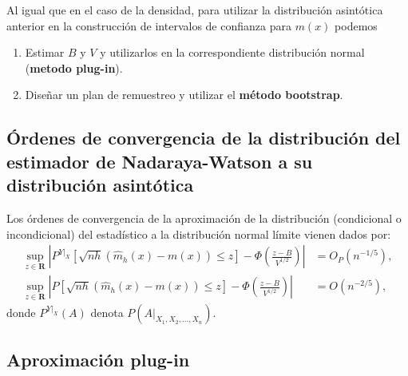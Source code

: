 \documentclass[
]{book}
\theoremstyle{break}
\theoremstyle{definition}
\theoremstyle{definition}
\theoremstyle{definition}
\theoremstyle{definition}
\theoremstyle{remark}
\begin{document}
Al igual que en el caso de la densidad, para utilizar la distribución
asintótica anterior en la construcción de intervalos de confianza para
\(m\left( x \right)\) podemos

\begin{enumerate}
\def\labelenumi{\arabic{enumi}.}
\item
  Estimar \(B\) y \(V\) y utilizarlos en la correspondiente distribución
  normal (\textbf{metodo plug-in}).
\item
  Diseñar un plan de remuestreo y utilizar el \textbf{método bootstrap}.
\end{enumerate}

\hypertarget{uxf3rdenes-de-convergencia-de-la-distribuciuxf3n-del-estimador-de-nadaraya-watson-a-su-distribuciuxf3n-asintuxf3tica}{%
\subsection{Órdenes de convergencia de la distribución del estimador de Nadaraya-Watson a su distribución asintótica}\label{uxf3rdenes-de-convergencia-de-la-distribuciuxf3n-del-estimador-de-nadaraya-watson-a-su-distribuciuxf3n-asintuxf3tica}}

Los órdenes de convergencia de la aproximación de la distribución
(condicional o incondicional) del estadístico a la distribución normal
límite vienen dados por:
\[\begin{aligned}
\sup_{z\in \boldsymbol{R}}\left\vert P^{\left. Y\right\vert _{X}}\left[ 
\sqrt{nh}\left( \hat{m}_{h}\left( x \right) -m\left( x \right) \right) \leq z
\right] -\Phi \left( \frac{z-B}{V^{1/2}} \right) \right\vert &= O_{P}\left(
n^{-1/5} \right), \\
\sup_{z\in \boldsymbol{R}}\left\vert P\left[ \sqrt{nh}\left( \hat{m}
_{h}\left( x \right) -m\left( x \right) \right) \leq z\right] -\Phi \left( 
\frac{z-B}{V^{1/2}} \right) \right\vert &= O\left( n^{-2/5} \right),
\end{aligned}\]
donde \(P^{\left. Y\right\vert_{X}}\left( A \right)\) denota
\(P\left( \left. A \right\vert_{X_1,X_2,\ldots ,X_n} \right)\).

\hypertarget{aproximaciuxf3n-plug-in-1}{%
\subsection{Aproximación plug-in}\label{aproximaciuxf3n-plug-in-1}}
\end{document}
